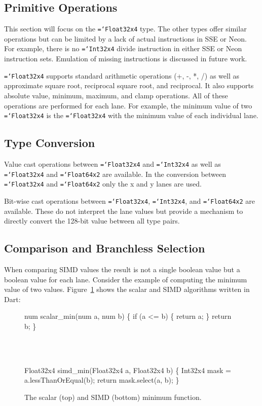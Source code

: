 \documentclass[preprint]{sigplanconf}
\newcommand{\ttt}[1]{{\texttt{\hyphenchar\font=`\-\relax #1}}}%
\begin{document}
\subsection{Primitive Operations}

This section will focus on the \ttt{Float32x4} type. The other types offer
similar operations but can be limited by a lack of actual instructions in SSE or
Neon. For example, there is no \ttt{Int32x4} divide instruction in either SSE or
Neon instruction sets. Emulation of missing instructions is discussed in future
work.

\ttt{Float32x4} supports standard arithmetic operations (+, -, *, /) as well as
approximate square root, reciprocal square root, and reciprocal. It also
supports absolute value, minimum, maximum, and clamp operations. All of these
operations are performed for each lane. For example, the minimum value of two
\ttt{Float32x4} is the \ttt{Float32x4} with the minimum value of each individual
lane.

\subsection{Type Conversion}

Value cast operations between \ttt{Float32x4} and \ttt{Int32x4} as well as
\ttt{Float32x4} and \ttt{Float64x2} are available. In the conversion between
\ttt{Float32x4} and \ttt{Float64x2} only the x and y lanes are used.

Bit-wise cast operations between \ttt{Float32x4}, \ttt{Int32x4}, and
\ttt{Float64x2} are available. These do not interpret the lane values but
provide a mechanism to directly convert the 128-bit value between all type
pairs.

\subsection{Comparison and Branchless Selection}

When comparing SIMD values the result is not a single boolean value but a
boolean value for each lane. Consider the example of computing the minimum value
of two values. Figure~\ref{fig:min} shows the scalar and SIMD algorithms written
in Dart:

\begin{figure}
\begin{small}
\begin{program}[style=tt, number=true]
nu\tab{}m scalar\_min(num a, num b) \{
  if\tab{} (a <= b) \{
    return a;\untab{}
  \}
  return b;\untab{}
\}
\end{program}
\end{small}
\ \ \\ \ \ \\
\begin{small}
\begin{program}[style=tt, number=true]
Fl\tab{}oat32x4 simd\_min(Float32x4 a, Float32x4 b) \{
  Int32x4 mask = a.lessThanOrEqual(b);
  return mask.select(a, b);\untab{}
\}
\end{program}
\end{small}
\caption{The scalar (top) and SIMD (bottom) minimum function.}
\label{fig:min}
\end{figure}
\end{document}
